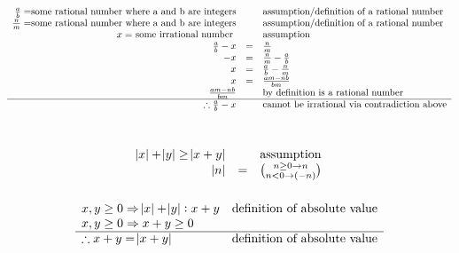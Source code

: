 \documentclass[letterpaper]{article}
\begin{document}
	\section{}
    	\begin{displaymath}
    		\begin{array}{rcl}
    			\frac{a}{b} = $some rational number where a and b are integers$ && 
                	$assumption/definition of a rational number$\\
                \frac{n}{m} = $some rational number where a and b are integers$ && 
                	$assumption/definition of a rational number$\\
                x = $ some irrational number $ && $assumption$\\
                \frac{a}{b} - x &=& \frac{n}{m}\\
                -x &=& \frac{n}{m} - \frac{a}{b}\\
                x &=& \frac{a}{b} - \frac{n}{m}\\
                x &=& \frac{am - nb}{bm}\\
                \frac{am - nb}{bm} && $by definition is a rational number$\\
                \hline
                \therefore \frac{a}{b} - x && $cannot be irrational via contradiction above$\\ 
    		\end{array}
    	\end{displaymath}
	\section{}
    	\begin{displaymath}
    		\begin{array}{rll}
            	\abs{x} + \abs{y} \geq \abs{x + y} && $assumption$\\
    			\abs{n} &=& \binom{n \geq 0 \rightarrow n}{n < 0 \rightarrow (-n)} 
    		\end{array}
    	\end{displaymath}
        \subsubsection{}
        	\begin{displaymath}
        		\begin{array}{ll}
        			x, y \geq 0 \Rightarrow \abs{x} + \abs{y}: x + y & $definition of absolute value$\\
                    x, y \geq 0 \Rightarrow x + y \geq 0 &\\
                    \hline
                    \therefore x + y = \abs{x + y} & $definition of absolute value$
        		\end{array}
        	\end{displaymath}
\end{document}
